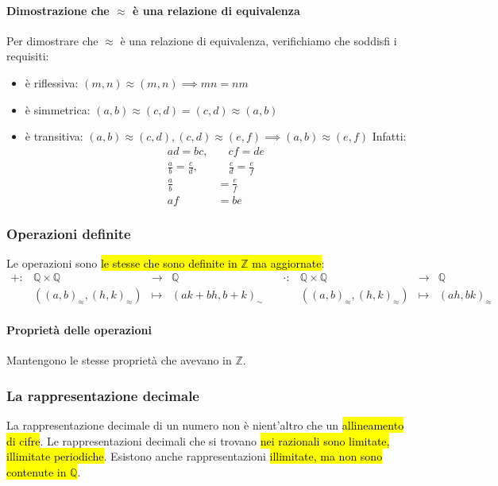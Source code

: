 \paragraph{Dimostrazione che $\approx$ è una relazione di equivalenza} Per
dimostrare che $\approx$ è una relazione di equivalenza, verifichiamo che soddisfi
i requisiti:
\begin{itemize}
    \item è riflessiva: $(m,n) \approx (m,n) \implies mn = nm$
    \item è simmetrica: $(a,b) \approx (c,d) = (c,d) \approx (a,b)$
    \item è transitiva: $(a,b) \approx (c,d), (c,d) \approx (e,f) \implies (a,b)\approx(e,f)$
        Infatti: 
        \begin{align*}
            ad=bc, &\quad cf=de \\
            \frac{a}{b}=\frac{c}{d}, &\quad \frac{c}{d}=\frac{e}{f} \\
            \frac{a}{b}&=\frac{e}{f} \\
            af&=be
        \end{align*}
\end{itemize}

\subsubsection{Operazioni definite} 
Le operazioni sono \hl{le stesse che sono definite in $\mathbb{Z}$ ma aggiornate}:
\[
    \begin{array}{cccc}
        +: &\mathbb{Q} \times \mathbb{Q} &\to &\mathbb{Q} \\
        &((a, b)_{\approx}, (h,k)_{\approx}) &\mapsto & (ak+bh, b+k)_{\sim}
    \end{array} \quad
    \begin{array}{cccc}
        \cdot: &\mathbb{Q} \times \mathbb{Q} &\to &\mathbb{Q} \\
        &((a, b)_{\approx}, (h,k)_{\approx}) &\mapsto & (ah, bk)_{\approx}
    \end{array}
\]

\paragraph{Proprietà delle operazioni} Mantengono le stesse proprietà che 
avevano in $\mathbb{Z}$.

\subsubsection{La rappresentazione decimale}
La rappresentazione decimale di un numero non è nient'altro che un \hl{allineamento
di cifre}. Le rappresentazioni decimali che si trovano \hl{nei razionali sono 
limitate, illimitate periodiche}. Esistono anche rappresentazioni \hl{illimitate,
ma non sono contenute in $\mathbb{Q}$}.

